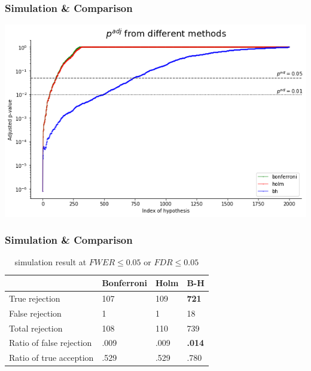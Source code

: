 \documentclass{beamer}
\begin{document}
\frame
{
    \frametitle{\LARGE Simulation \& Comparison}
    \normalsize
    \includegraphics[scale=0.5]{adj_pval}
}

\frame
{
    \frametitle{\LARGE Simulation \& Comparison}
    \normalsize
    \begin{table}
      \small
      \setlength{\tabcolsep}{3pt}
    \begin{tabularx}{\hsize}{@{}l LLL@{}}
        \toprule
     & Bonferroni  & Holm & B-H \\
        \midrule
    True rejection
        & 107
            & 109
                & \textbf{721}\\
    False rejection 
        &  1
            & 1
                & 18 \\
    Total rejection
        & 108
            & 110
                &  739   \\
    \midrule
    Ratio of false rejection 
            & .009
                & .009
                    & \textbf{.014}    \\
    Ratio of true acception 
            & .529
                & .529
                    & .780    \\
        \bottomrule
      \end{tabularx}
      \caption{simulation result at $FWER \leq 0.05$ or $FDR \leq 0.05$}
    \end{table}
}
\end{document}
